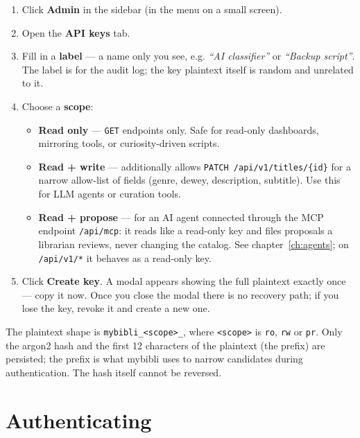 \begin{enumerate}
  \item Click \textbf{Admin} in the sidebar (in the menu on a
        small screen).
  \item Open the \textbf{API keys} tab.
  \item Fill in a \textbf{label} — a name only you see, e.g.
        \emph{``AI classifier''} or \emph{``Backup script''}. The
        label is for the audit log; the key plaintext itself is
        random and unrelated to it.
  \item Choose a \textbf{scope}:
        \begin{itemize}
          \item \textbf{Read only} — \texttt{GET} endpoints only.
                Safe for read-only dashboards, mirroring tools,
                or curiosity-driven scripts.
          \item \textbf{Read + write} — additionally allows
                \texttt{PATCH /api/v1/titles/\{id\}} for a
                narrow allow-list of fields (genre, dewey,
                description, subtitle). Use this for LLM agents
                or curation tools.
          \item \textbf{Read + propose} — for an AI agent connected
                through the MCP endpoint \texttt{/api/mcp}: it reads
                like a read-only key and files proposals a librarian
                reviews, never changing the catalog. See
                chapter~\ref{ch:agents}; on \texttt{/api/v1/*} it
                behaves as a read-only key.
        \end{itemize}
  \item Click \textbf{Create key}. A modal appears showing the
        full plaintext exactly once — copy it now. Once you
        close the modal there is no recovery path; if you lose
        the key, revoke it and create a new one.
\end{enumerate}

The plaintext shape is
\texttt{mybibli\_<scope>\_<random40>}, where \texttt{<scope>} is
\texttt{ro}, \texttt{rw} or \texttt{pr}. Only the argon2 hash and the first
12 characters of the plaintext (the prefix) are persisted; the
prefix is what mybibli uses to narrow candidates during
authentication. The hash itself cannot be reversed.

\section{Authenticating}

